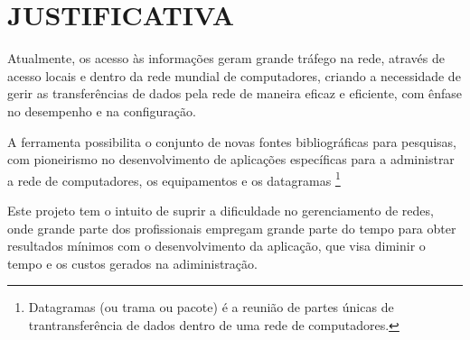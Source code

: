 \chapter{JUSTIFICATIVA}

\par Atualmente, os acesso às informações geram grande tráfego na rede, através de acesso
locais e dentro da rede mundial de computadores, criando a necessidade de gerir as transferências
de dados pela rede de maneira eficaz e eficiente, com ênfase no desempenho e na configuração.

\par A ferramenta possibilita o conjunto de novas fontes bibliográficas para pesquisas, com
pioneirismo no desenvolvimento de aplicações específicas para a administrar a rede de computadores,
os equipamentos e os datagramas \footnote{Datagramas (ou trama ou pacote) é a reunião de partes únicas 
de trantransferência de dados dentro de uma rede de computadores.}

\par Este projeto tem o intuito de suprir a dificuldade no gerenciamento de redes, onde grande
parte dos profissionais empregam grande parte do tempo para obter resultados mínimos com o
desenvolvimento da aplicação, que visa diminir o tempo e os custos gerados na adiministração.



 

